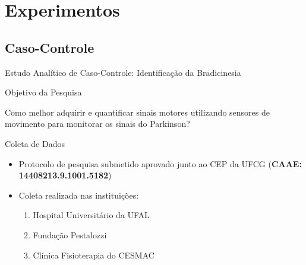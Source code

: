 \documentclass{beamer}
\begin{document}




\section{Experimentos}
\subsection{Caso-Controle}
\begin{frame}{Estudo Analítico de Caso-Controle: Identificação da Bradicinesia} 
    \begin{block}{Objetivo da Pesquisa}

    
    Como melhor adquirir e quantificar sinais motores utilizando sensores de movimento para monitorar os sinais do Parkinson?

    \end{block}
		\begin{block}{Coleta de Dados}
			\begin{itemize}
				\item Protocolo de pesquisa submetido aprovado junto ao CEP da UFCG (\textbf{CAAE: 14408213.9.1001.5182})
				\item Coleta realizada nas instituições:
					\begin{enumerate}
						\item Hospital Universitário da UFAL
						\item Fundação Pestalozzi
						\item Clínica Fisioterapia do CESMAC
				\end{enumerate}				
			\end{itemize}
    \end{block}
\end{frame}
\end{document}
